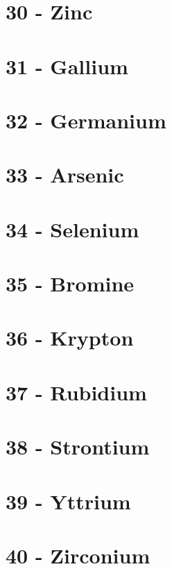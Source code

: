 \documentclass{book}
\begin{document}
\section{30 - Zinc}
\label{sec:elem-zinc}

\section{31 - Gallium}
\label{sec:elem-gallium}

\section{32 - Germanium}
\label{sec:elem-germanium}

\section{33 - Arsenic}
\label{sec:elem-arsenic}

\section{34 - Selenium}
\label{sec:elem-selenium}

\section{35 - Bromine}
\label{sec:elem-bromine}

\section{36 - Krypton}
\label{sec:elem-krypton}

\section{37 - Rubidium}
\label{sec:elem-rubidium}

\section{38 - Strontium}
\label{sec:elem-strontium}

\section{39 - Yttrium}
\label{sec:elem-yttrium}

\section{40 - Zirconium}
\label{sec:elem-zirconium}
\end{document}
